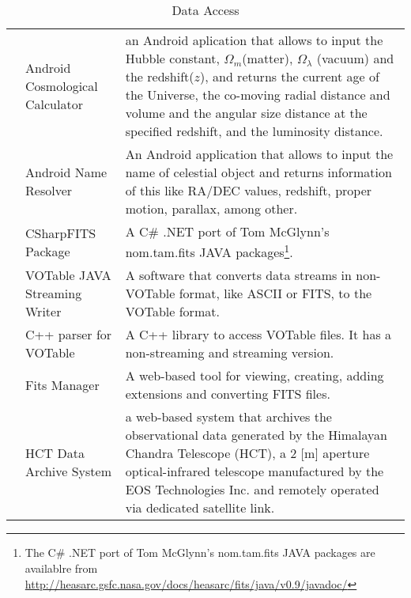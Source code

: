 \begin{table*}[h!t]
\begin{tabular}{|l|l|p{12.5cm}|}
			& Android Cosmological Calculator & an Android aplication that allows to input the Hubble constant, $ \Omega_{m} $(matter), $ \Omega_{\lambda} 
									$ (vacuum) and the redshift($ z $), and returns the current age of the Universe, the co-moving radial distance and 
									volume and the angular size distance at the specified redshift, and the luminosity distance.\\
			& Android Name Resolver & An Android application that allows to input the name of celestial object and returns information of this like 
									RA/DEC values, redshift, proper motion, parallax, among other.\\
			& CSharpFITS Package & A C\# .NET port of Tom McGlynn's nom.tam.fits JAVA packages\footnote{The C\# .NET port of Tom McGlynn's nom.tam.fits 
									JAVA packages are availablre from \url{http://heasarc.gsfc.nasa.gov/docs/heasarc/fits/java/v0.9/javadoc/}}.\\
			& VOTable JAVA Streaming Writer & A software that converts data streams in non-VOTable format, like ASCII or FITS, to the VOTable format. \\
			& C++ parser for VOTable & A C++ library to access VOTable files. It has a non-streaming and streaming version.\\
			& Fits Manager & A web-based tool for viewing, creating, adding extensions and converting FITS files.\\
			& HCT Data Archive System & a web-based system that archives the observational data generated by the Himalayan Chandra Telescope (HCT), a 2 [m]
									 aperture optical-infrared telescope manufactured by the EOS Technologies Inc. and remotely operated via dedicated
									 satellite link.\\
	\hline
	\end{tabular}
	\caption{Data Access}
	\label{table:da}
\end{table*}



